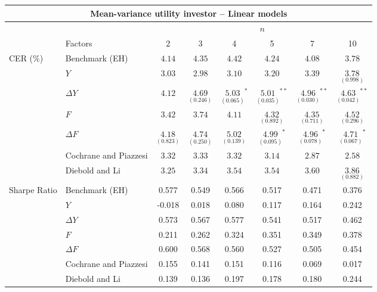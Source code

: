 \begin{tabular}{llcccccc}
    \hline
	\multicolumn{8}{c}{Mean-variance utility investor -- Linear models}\\\hline
	&& \multicolumn{6}{c}{$n$}\\\cline{3-8}
&Factors   & 2  & 3      & 4       & 5       & 7 & 10 \\
\hline
CER (\%) & Benchmark (EH) & $4.14$ & $4.35$ & $4.42$ & $4.24$ & $4.08$ & $3.78$ \\
 & $Y$ & $3.03$ & $2.98$ & $3.10$ & $3.20$ & $3.39$ & \hspace{0.2cm} $\underset{(0.998)}{3.78}^{}$ \\
 & $\Delta Y$ & $4.12$ & \hspace{0.2cm} $\underset{(0.246)}{4.69}^{}$ & \hspace{0.2cm} $\underset{(0.065)}{5.03}^{*}$ & \hspace{0.2cm} $\underset{(0.035)}{5.01}^{**}$ & \hspace{0.2cm} $\underset{(0.030)}{4.96}^{**}$ & \hspace{0.2cm} $\underset{(0.042)}{4.63}^{**}$ \\
 & $F$ & $3.42$ & $3.74$ & $4.11$ & \hspace{0.2cm} $\underset{(0.892)}{4.32}^{}$ & \hspace{0.2cm} $\underset{(0.711)}{4.35}^{}$ & \hspace{0.2cm} $\underset{(0.296)}{4.52}^{}$ \\
 & $\Delta F$ & \hspace{0.2cm} $\underset{(0.823)}{4.18}^{}$ & \hspace{0.2cm} $\underset{(0.250)}{4.74}^{}$ & \hspace{0.2cm} $\underset{(0.139)}{5.02}^{}$ & \hspace{0.2cm} $\underset{(0.095)}{4.99}^{*}$ & \hspace{0.2cm} $\underset{(0.078)}{4.96}^{*}$ & \hspace{0.2cm} $\underset{(0.067)}{4.71}^{*}$ \\
 & Cochrane and Piazzesi & $3.32$ & $3.33$ & $3.32$ & $3.14$ & $2.87$ & $2.58$ \\
 & Diebold and Li & $3.25$ & $3.34$ & $3.54$ & $3.54$ & $3.60$ & \hspace{0.2cm} $\underset{(0.882)}{3.86}^{}$ \\
    \hline
Sharpe Ratio & Benchmark (EH) & 0.577 & 0.549 & 0.566 & 0.517 & 0.471 & 0.376 \\
 & $Y$ & -0.018 & 0.018 & 0.080 & 0.117 & 0.164 & 0.242 \\
 & $\Delta Y$ & 0.573 & 0.567 & 0.577 & 0.541 & 0.517 & 0.462 \\
 & $F$ & 0.211 & 0.262 & 0.324 & 0.351 & 0.349 & 0.378 \\
 & $\Delta F$ & 0.600 & 0.568 & 0.560 & 0.527 & 0.505 & 0.454 \\
 & Cochrane and Piazzesi & 0.155 & 0.141 & 0.151 & 0.116 & 0.069 & 0.017 \\
 & Diebold and Li & 0.139 & 0.136 & 0.197 & 0.178 & 0.180 & 0.244 \\
\hline
    \end{tabular}
